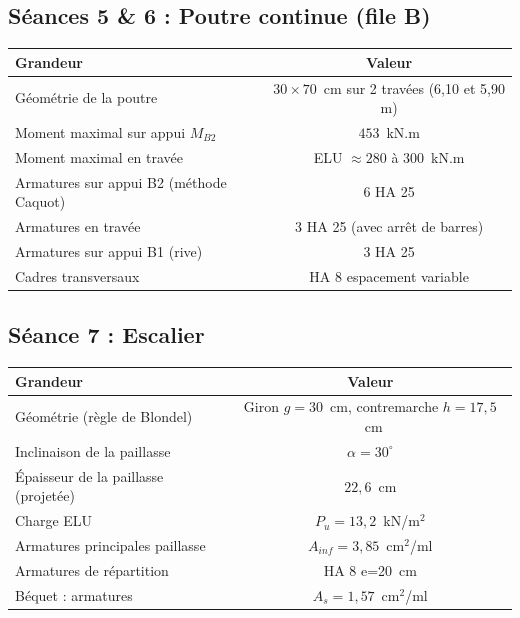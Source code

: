 \subsection*{Séances 5 \& 6 : Poutre continue (file B)}

\begin{tabularx}{\linewidth}{Xc}
\toprule
\textbf{Grandeur} & \textbf{Valeur} \\
\midrule
Géométrie de la poutre                              & $30 \times 70$~cm sur 2 travées (6{,}10 et 5{,}90 m) \\
Moment maximal sur appui $M_{B2}$                   & $453$~kN.m \\
Moment maximal en travée                            & ELU $\approx 280$ à $300$~kN.m \\
Armatures sur appui B2 (méthode Caquot)             & $6$ HA 25 \\
Armatures en travée                                  & $3$ HA 25 (avec arrêt de barres) \\
Armatures sur appui B1 (rive)                       & $3$ HA 25 \\
Cadres transversaux                                  & HA 8 espacement variable \\
\bottomrule
\end{tabularx}

\subsection*{Séance 7 : Escalier}

\begin{tabularx}{\linewidth}{Xc}
\toprule
\textbf{Grandeur} & \textbf{Valeur} \\
\midrule
Géométrie (règle de Blondel)                & Giron $g = 30$~cm, contremarche $h = 17{,}5$~cm \\
Inclinaison de la paillasse                  & $\alpha = 30^\circ$ \\
Épaisseur de la paillasse (projetée)         & $22{,}6$~cm \\
Charge ELU                                    & $P_u = 13{,}2$~kN/m$^{2}$ \\
Armatures principales paillasse               & $A_{inf} = 3{,}85$~cm$^{2}$/ml \\
Armatures de répartition                      & HA 8 e=20~cm \\
Béquet : armatures                          & $A_s = 1{,}57$~cm$^{2}$/ml \\
\bottomrule
\end{tabularx}

